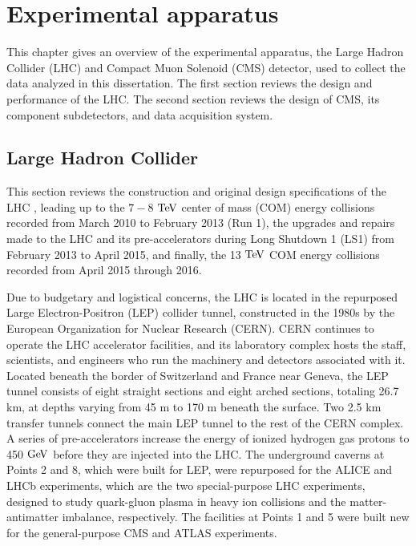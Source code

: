 \chapter{Experimental apparatus}

This chapter gives an overview of the experimental apparatus, the Large Hadron Collider (LHC) and Compact Muon Solenoid (CMS) detector, used to collect the data analyzed in this dissertation. The first section reviews the design and performance of the LHC. The second section reviews the design of CMS, its component subdetectors, and data acquisition system.  

\section{Large Hadron Collider}

This section reviews the construction and original design specifications of the LHC \cite{1748-0221-3-08-S08001}, leading up to the $7-8$ $\mathrm{Te\kern -0.1em V}$ center of mass (COM) energy collisions recorded from March 2010 to February 2013 (Run 1), the upgrades and repairs made to the LHC and its pre-accelerators during Long Shutdown 1 (LS1) from February 2013 to April 2015, and finally, the 13 $\mathrm{Te\kern -0.1em V}$ COM energy collisions recorded from April 2015 through 2016. 

\indent Due to budgetary and logistical concerns, the LHC is located in the repurposed Large Electron-Positron (LEP) collider tunnel, constructed in the 1980s by the European Organization for Nuclear Research (CERN). CERN continues to operate the LHC accelerator facilities, and its laboratory complex hosts the staff, scientists, and engineers who run the machinery and detectors associated with it. Located beneath the border of Switzerland and France near Geneva, the LEP tunnel consists of eight straight sections and eight arched sections, totaling 26.7 km, at depths varying from 45 m to 170 m beneath the surface. Two 2.5 km transfer tunnels connect the main LEP tunnel to the rest of the CERN complex. A series of pre-accelerators increase the energy of ionized hydrogen gas protons to 450 $\mathrm{Ge\kern -0.1em V}$ before they are injected into the LHC. The underground caverns at Points 2 and 8, which were built for LEP, were repurposed for the ALICE and LHCb experiments, which are the two special-purpose LHC experiments, designed to study quark-gluon plasma in heavy ion collisions and the matter-antimatter imbalance, respectively. The facilities at Points 1 and 5 were built new for the general-purpose CMS and ATLAS experiments. 

